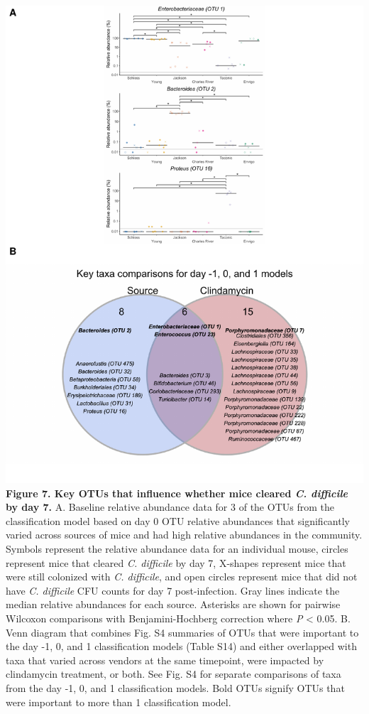 \documentclass[11pt,]{article}
\begin{document}
\newpage

\includegraphics{figure_7.pdf} \textbf{Figure 7. Key OTUs that influence
whether mice cleared \emph{C. difficile} by day 7.} A. Baseline relative
abundance data for 3 of the OTUs from the classification model based on
day 0 OTU relative abundances that significantly varied across sources
of mice and had high relative abundances in the community. Symbols
represent the relative abundance data for an individual mouse, circles
represent mice that cleared \emph{C. difficile} by day 7, X-shapes
represent mice that were still colonized with \emph{C. difficile}, and
open circles represent mice that did not have \emph{C. difficile} CFU
counts for day 7 post-infection. Gray lines indicate the median relative
abundances for each source. Asterisks are shown for pairwise Wilcoxon
comparisons with Benjamini-Hochberg correction where \emph{P}
\textless{} 0.05. B. Venn diagram that combines Fig. S4 summaries of
OTUs that were important to the day -1, 0, and 1 classification models
(Table S14) and either overlapped with taxa that varied across vendors
at the same timepoint, were impacted by clindamycin treatment, or both.
See Fig. S4 for separate comparisons of taxa from the day -1, 0, and 1
classification models. Bold OTUs signify OTUs that were important to
more than 1 classification model.
\end{document}
